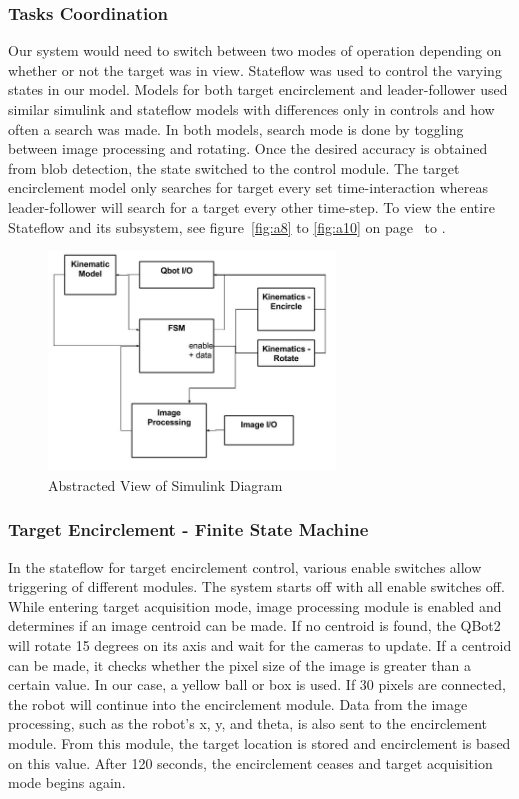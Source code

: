 \documentclass[conference]{IEEEtran}
\begin{document}
\subsubsection{Tasks Coordination}
Our system would need to switch between two modes of operation depending on whether or not the target was in view.   Stateflow was used to control the varying states in our model. Models for both target encirclement and leader-follower used similar simulink and stateflow models with differences only in controls and how often a search was made. In both models, search mode is done by toggling between image processing and rotating. Once the desired accuracy is obtained from blob detection, the state switched to the control module.  The target encirclement model only searches for target every set time-interaction whereas leader-follower will search for a target every other time-step. 
To view the entire Stateflow and its subsystem, see figure~\ref{fig:a8} to \ref{fig:a10} on page~\pageref{fig:a8} to \pageref{fig:a10}.

\begin{figure}[htbp]
\begin{center}
\includegraphics[width=3in]{8}
\caption{Abstracted View of Simulink Diagram} \label{fig:8}
\end{center}
\end{figure}

\subsubsection{Target Encirclement - Finite State Machine}
In the stateflow for target encirclement control, various enable switches allow triggering of different modules. The system starts off with all enable switches off. While entering target acquisition mode, image processing module is enabled and determines if an image centroid can be made. If no centroid is found, the QBot2 will rotate 15 degrees on its axis and wait for the cameras to update. If a centroid can be made, it checks whether the pixel size of the image is greater than a certain value. In our case, a yellow ball or box is used. If 30 pixels are connected, the robot will continue into the encirclement module. Data from the image processing, such as the robot’s x, y, and theta, is also sent to the encirclement module. From this module, the target location is stored and encirclement is based on this value. After 120 seconds, the encirclement ceases and target acquisition mode begins again. 
\end{document}
